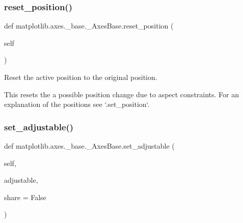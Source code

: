 \subsubsection{\texorpdfstring{reset\+\_\+position()}{reset\_position()}}
{\footnotesize\ttfamily def matplotlib.\+axes.\+\_\+base.\+\_\+\+Axes\+Base.\+reset\+\_\+position (\begin{DoxyParamCaption}\item[{}]{self }\end{DoxyParamCaption})}

\begin{DoxyVerb}Reset the active position to the original position.

This resets the a possible position change due to aspect constraints.
For an explanation of the positions see `.set_position`.
\end{DoxyVerb}
 \mbox{\label{classmatplotlib_1_1axes_1_1__base_1_1__AxesBase_ad1bff98b0950ad31c18e032e1de19e7e}} 
\subsubsection{\texorpdfstring{set\+\_\+adjustable()}{set\_adjustable()}}
{\footnotesize\ttfamily def matplotlib.\+axes.\+\_\+base.\+\_\+\+Axes\+Base.\+set\+\_\+adjustable (\begin{DoxyParamCaption}\item[{}]{self,  }\item[{}]{adjustable,  }\item[{}]{share = {\ttfamily False} }\end{DoxyParamCaption})}

